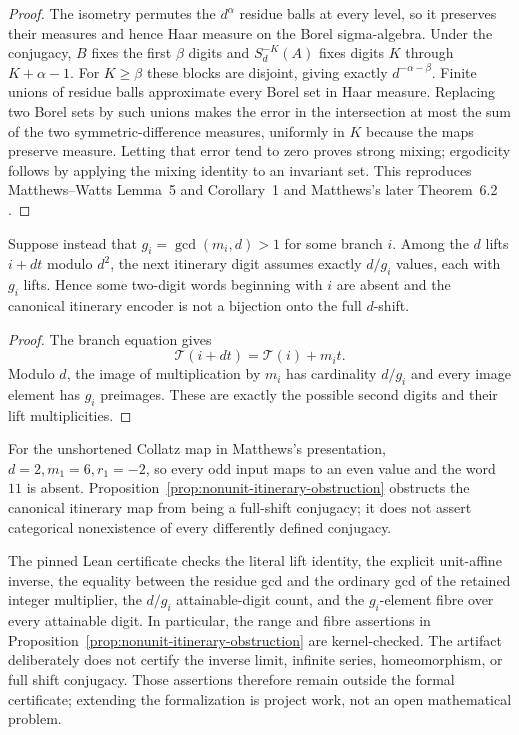 \begin{proof}
The isometry permutes the $d^{\alpha}$ residue balls at every level, so it
preserves their measures and hence Haar measure on the Borel sigma-algebra.
Under the conjugacy, $B$ fixes the first $\beta$ digits and $S_d^{-K}(A)$ fixes
digits $K$ through $K+\alpha-1$.  For $K\geq\beta$ these blocks are disjoint,
giving exactly $d^{-\alpha-\beta}$.  Finite unions of residue balls approximate
every Borel set in Haar measure.  Replacing two Borel sets by such unions makes
the error in the intersection at most the sum of the two symmetric-difference
measures, uniformly in $K$ because the maps preserve measure.  Letting that
error tend to zero proves strong mixing; ergodicity follows by applying the
mixing identity to an invariant set.  This reproduces Matthews--Watts Lemma~5
and Corollary~1 and Matthews's later Theorem~6.2
\cite[pp.~173--174]{MatthewsWatts1984}
\cite[author-form pp.~12--13]{Matthews2010AuthorForm}.
\end{proof}

\begin{proposition}
\label{prop:nonunit-itinerary-obstruction}
Suppose instead that $g_i=\gcd(m_i,d)>1$ for some branch $i$.  Among the
$d$ lifts $i+dt$ modulo $d^2$, the next itinerary digit assumes exactly
$d/g_i$ values, each with $g_i$ lifts.  Hence some two-digit words beginning
with $i$ are absent and the canonical itinerary encoder is not a bijection
onto the full $d$-shift.
\end{proposition}

\begin{proof}
The branch equation gives
\[
 \mathcal T(i+dt)=\mathcal T(i)+m_it.
\]
Modulo $d$, the image of multiplication by $m_i$ has cardinality $d/g_i$ and
every image element has $g_i$ preimages.  These are exactly the possible
second digits and their lift multiplicities.
\end{proof}

For the unshortened Collatz map in Matthews's presentation,
$d=2,m_1=6,r_1=-2$, so every odd input maps to an even value and the word
$11$ is absent.  Proposition~\ref{prop:nonunit-itinerary-obstruction} obstructs
the canonical itinerary map from being a full-shift conjugacy; it does not
assert categorical nonexistence of every differently defined conjugacy.

\begin{remark}
The pinned Lean certificate checks the literal lift identity, the explicit
unit-affine inverse, the equality between the residue gcd and the ordinary gcd
of the retained integer multiplier, the
$d/g_i$ attainable-digit count, and the $g_i$-element fibre over every
attainable digit.  In particular, the range and fibre assertions in
Proposition~\ref{prop:nonunit-itinerary-obstruction} are kernel-checked.  The
artifact deliberately does not certify the inverse limit, infinite series,
homeomorphism, or full shift conjugacy. Those assertions therefore remain
outside the formal certificate; extending the formalization is project work,
not an open mathematical problem.
\end{remark}

